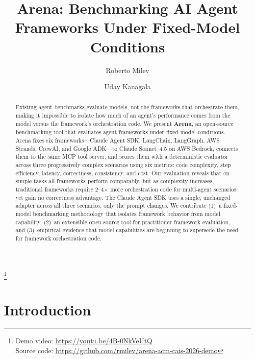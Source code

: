 \documentclass[sigconf]{acmart}
\begin{document}
\title{Arena: Benchmarking AI Agent Frameworks Under Fixed-Model Conditions}
\thanks{Demo video: \url{https://youtu.be/4B-0NkVeUtQ} \\
        Source code: \url{https://github.com/rmilev/arena-acm-cais-2026-demo}}

\author{Roberto Milev}

\author{Uday Kanagala}

\begin{abstract}
Existing agent benchmarks evaluate models, not the frameworks that orchestrate them, making it impossible to isolate how much of an agent's performance comes from the model versus the framework's orchestration code. We present \textbf{Arena}, an open-source benchmarking tool that evaluates agent frameworks under fixed-model conditions. Arena fixes six frameworks---Claude Agent SDK, LangChain, LangGraph, AWS Strands, CrewAI, and Google ADK---to Claude Sonnet~4.5 on AWS Bedrock, connects them to the same MCP tool server, and scores them with a deterministic evaluator across three progressively complex scenarios using six metrics: code complexity, step efficiency, latency, correctness, consistency, and cost. Our evaluation reveals that on simple tasks all frameworks perform comparably, but as complexity increases, traditional frameworks require 2--4$\times$ more orchestration code for multi-agent scenarios yet gain no correctness advantage. The Claude Agent SDK uses a single, unchanged adapter across all three scenarios; only the prompt changes. We contribute (1)~a fixed-model benchmarking methodology that isolates framework behavior from model capability, (2)~an extensible open-source tool for practitioner framework evaluation, and (3)~empirical evidence that model capabilities are beginning to supersede the need for framework orchestration code.
\end{abstract}

\maketitle

\section{Introduction}
\end{document}

